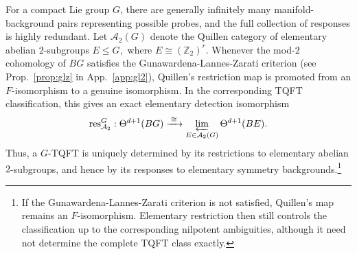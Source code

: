 \documentclass[aps,prx,reprint,superscriptaddress,twocolumn,amsmath,amssymb,amsfonts, nofootinbib]{revtex4-2}
\newcommand{\res}{\text{res}}
\theoremstyle{apsstyle}
\begin{document}
\bigskip 

For a compact Lie group $G$, there are generally infinitely many manifold-background pairs representing possible probes, and the full collection of responses is highly redundant. Let $\mathcal A_2(G)$ denote the Quillen category of elementary abelian $2$-subgroups $E\leq G,$ where $E\cong (\mathbb Z_2)^r$. Whenever the mod-$2$ cohomology of $BG$ satisfies the Gunawardena-Lannes-Zarati criterion (see Prop.~\ref{prop:glz} in App.~\ref{app:gl2}), Quillen's restriction map is promoted from an $F$-isomorphism to a genuine isomorphism. In the corresponding TQFT classification, this gives an exact elementary detection isomorphism
\begin{equation}
\res_{\mathcal{A}_{2}}^{G}: \Theta^{d+1}(BG) \xrightarrow{\;\cong\;}
\varprojlim_{E\in\mathcal A_2(G)} \Theta^{d+1}(BE).
\label{eq:general_elementary_detection}
\end{equation}
Thus, a $G$-TQFT is uniquely determined by its restrictions to elementary abelian $2$-subgroups, and hence by its responses to elementary symmetry backgrounds.\footnote{If the Gunawardena-Lannes-Zarati criterion is not satisfied, Quillen's map remains an $F$-isomorphism. Elementary restriction then still controls the classification up to the corresponding nilpotent ambiguities, although it need not determine the complete TQFT class exactly.}

\bigskip 
\end{document}
